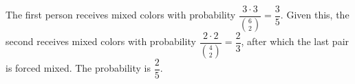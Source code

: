 The first person receives mixed colors with probability $\dfrac{3\cdot3}{\binom62}=\dfrac{3}{5}$. Given this, the second receives mixed colors with probability $\dfrac{2\cdot2}{\binom42}=\dfrac{2}{3}$, after which the last pair is forced mixed. The probability is $\boxed{\dfrac{2}{5}}$.
